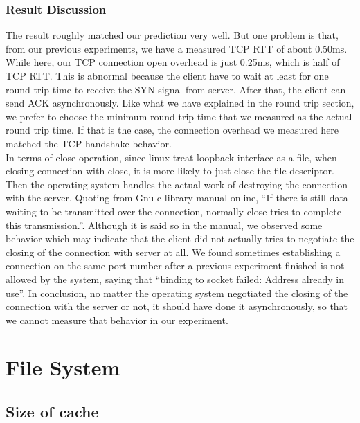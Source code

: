 \documentclass{article} %
\begin{document}
\subsubsection{Result Discussion}
The result roughly matched our prediction very well. But one problem is that, from our previous experiments, we have a measured TCP RTT of about 0.50ms. While here, our TCP connection open overhead is just 0.25ms, which is half of TCP RTT. This is abnormal because the client have to wait at least for one round trip time to receive the SYN signal from server. After that, the client can send ACK asynchronously. Like what we have explained in the round trip section, we prefer to choose the minimum round trip time that we measured as the actual round trip time. If that is the case, the connection overhead we measured here matched the TCP handshake behavior.\\
In terms of close operation, since linux treat loopback interface as a file, when closing connection with close, it is more likely to just close the file descriptor. Then the operating system handles the actual work of destroying the connection with the server. Quoting from Gnu c library manual online, ``If there is still data waiting to be transmitted over the connection, normally close tries to complete this transmission.''. Although it is said so in the manual, we observed some behavior which may indicate that the client did not actually tries to negotiate the closing of the connection with server at all. We found sometimes establishing a connection on the same port number after a previous experiment finished is not allowed by the system, saying that ``binding to socket failed: Address already in use''. In conclusion, no matter the operating system negotiated the closing of the connection with the server or not, it should have done it asynchronously, so that we cannot measure that behavior in our experiment. \\

\section{File System}

\subsection{Size of cache}
\end{document}
